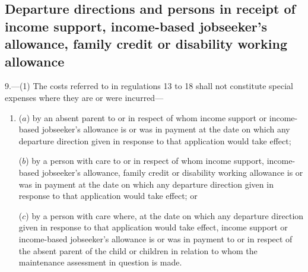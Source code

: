 \documentclass[12pt,a4paper]{article}
\begin{document}
%
%
%

\subsection[9. Departure directions and persons in receipt of income support, income-based jobseeker’s allowance, family credit or disability working allowance]{Departure directions and persons in receipt of income support, income-based jobseeker’s allowance, family credit or disability working allowance}

9.—(1) The costs referred to in regulations 13 to 18 shall not constitute special expenses where they are or were incurred—
\begin{enumerate}\item[]
($a$) by an absent parent to or in respect of whom income support or income-based jobseeker’s allowance is or was in payment at the date on which any departure direction given in response to that application would take effect;

($b$) by a person with care to or in respect of whom income support, income-based jobseeker’s allowance, family credit or disability working allowance is or was in payment at the date on which any departure direction given in response to that application would take effect; or

($c$) by a person with care where, at the date on which any departure direction given in response to that application would take effect, income support or income-based jobseeker’s allowance is or was in payment to or in respect of the absent parent of the child or children in relation to whom the maintenance assessment in question is made.
\end{enumerate}
\end{document}
